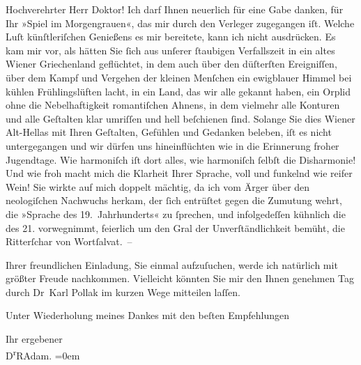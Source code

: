 \pstart\center{}Hochverehrter Herr Doktor!\pend\vspace{0.5em}
\pstart
           Ich darf Ihnen neuerlich für eine Gabe danken, für Ihr »Spiel im Morgengrauen«, das mir durch den Verleger zugegangen iſt. Welche Luſt
               künſtleriſchen Genießens es mir bereitete, kann ich nicht ausdrücken. Es kam mir vor,
               als hätten Sie{ }ſich aus unſerer{ }ſtaubigen Verfallszeit in ein altes Wiener Griechenland
               geflüchtet, in dem auch über den düſterſten Ereigniſſen, über dem Kampf und Vergehen
                  der kleinen Menſchen ein ewigblauer
               Himmel bei kühlen Frühlingslüften lacht, in ein Land, das wir alle gekannt haben, ein
               Orplid ohne die Nebelhaftigkeit romantiſchen Ahnens, in dem vielmehr alle Konturen
               und alle Geſtalten klar umriſſen und hell beſchienen{ }ſind. Solange Sie dies Wiener Alt-Hellas mit Ihren Geſtalten, Gefühlen und Gedanken beleben, iſt es nicht
               untergegangen und wir dürfen uns hineinflüchten wie in die Erinnerung froher
               Jugendtage. Wie harmoniſch iſt dort alles, wie harmoniſch{ }ſelbſt die Disharmonie! Und
               wie froh macht mich die Klarheit Ihrer {\pb}Sprache, voll und funkelnd wie reifer Wein! Sie wirkte auf mich doppelt mächtig, da
               ich vom Ärger über den neologiſchen Nachwuchs herkam, der{ }ſich entrüſtet gegen die
               Zumutung wehrt, die »Sprache des 19. Jahrhunderts« zu{ }ſprechen, und infolgedeſſen
               kühnlich die des 21. vorwegnimmt, feierlich um den Gral der Unverſtändlichkeit
               bemüht, die Ritterſchar von Wortſalvat. –\pend
           
\pstart
           Ihrer freundlichen Einladung, Sie einmal aufzuſuchen, werde ich natürlich mit größter
               Freude nachkommen. Vielleicht könnten Sie mir den Ihnen genehmen Tag durch Dr Karl Pollak im kurzen Wege mitteilen
               laſſen.\pend
           
\pstart
           {\pb}Unter Wiederholung meines Dankes mit den
               beſten Empfehlungen\pend
           
\pstart
           Ihr ergebener{\\[\baselineskip]}\spacefill\mbox{D\textsuperscript{r}RAdam.}\pend
           \leftskip=0em{}\endnumbering{}  \newcommand{\dateiname}{L02485}\newcommand{\titel}{Robert Adam an Arthur Schnitzler, 1. 5. 1927}\newcommand{\editorInnen}{Martin Anton Müller und Gerd-Hermann Susen}
